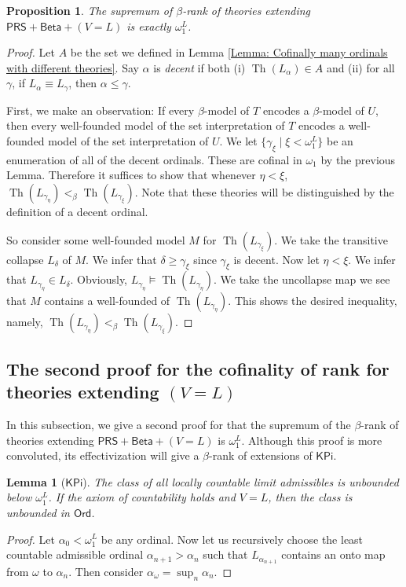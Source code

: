 \documentclass{amsart}
\newtheorem{lemma}[theorem]{Lemma}
\newtheorem{proposition}[proposition]{Proposition}
\theoremstyle{remark}
\newcommand{\PRS}{\mathsf{PRS}}
\newcommand{\KPi}{\mathsf{KPi}}
\newcommand{\Th}{\operatorname{Th}}
\newcommand{\Ord}{\mathsf{Ord}}
\begin{document}
\begin{proposition} \label{Proposition: Beta rank for ATR0 is uncountable under V=L}
    The supremum of $\beta$-rank of theories extending $\PRS + \mathsf{Beta} + (V=L)$ is exactly $\omega_1^L$.
\end{proposition}
\begin{proof}
    Let $A$ be the set we defined in Lemma \ref{Lemma: Cofinally many ordinals with different theories}. Say $\alpha$ is \emph{decent} if both (i) $\Th(L_\alpha)\in A$ and (ii) for all $\gamma$, if $L_\alpha\equiv L_\gamma$, then $\alpha\le \gamma$.
    
    First, we make an observation: If every $\beta$-model of $T$ encodes a $\beta$-model of $U$, then every well-founded model of the set interpretation of $T$ encodes a well-founded model of the set interpretation of $U$.
    We let $\{\gamma_\xi \mid \xi<\omega^L_1\}$ be an enumeration of all of the decent ordinals. These are cofinal in $\omega_1$ by the previous Lemma. Therefore it suffices to show that whenever $\eta<\xi$, $\Th(L_{\gamma_\eta})<_{\beta} \Th(L_{\gamma_\xi})$. Note that these theories will be distinguished by the definition of a decent ordinal.

    So consider some well-founded model $M$ for $\Th(L_{\gamma_\xi})$. We take the transitive collapse $L_\delta$ of $M$. We infer that $\delta\geq \gamma_\xi$ since $\gamma_\xi$ is decent.
    Now let $\eta<\xi$. We infer that $L_{\gamma_\eta} \in L_\delta$. Obviously, $L_{\gamma_\eta} \vDash \Th(L_{\gamma_\eta}).$ We take the uncollapse map we see that $M$ contains a well-founded of $\Th(L_{\gamma_\eta})$.
    This shows the desired inequality, namely, $\Th(L_{\gamma_\eta})<_{\beta} \Th(L_{\gamma_\xi})$.
\end{proof}

\subsection{The second proof for the cofinality of rank for theories extending \texorpdfstring{$(V=L)$}{V=L}}
In this subsection, we give a second proof for that the supremum of the $\beta$-rank of theories extending $\PRS + \mathsf{Beta} + (V=L)$ is $\omega_1^L$. Although this proof is more convoluted, its effectivization will give a $\beta$-rank of extensions of $\KPi$.

\begin{lemma}[$\KPi$]
    The class of all locally countable limit admissibles is unbounded below $\omega_1^L$. If the axiom of countability holds and $V=L$, then the class is unbounded in $\Ord$.
\end{lemma}
\begin{proof}
    Let $\alpha_0<\omega_1^L$ be any ordinal. Now let us recursively choose the least countable admissible ordinal $\alpha_{n+1}>\alpha_n$ such that $L_{\alpha_{n+1}}$ contains an onto map from $\omega$ to $\alpha_n$. Then consider $\alpha_\omega = \sup_n\alpha_n$.
\end{proof}
\end{document}
